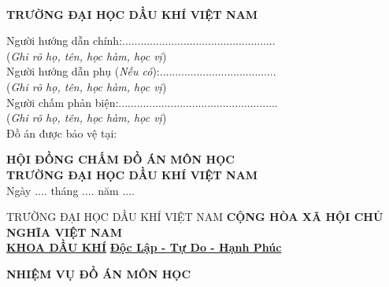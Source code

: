 \documentclass[12pt,a4paper]{report}
\begin{document}

\begin{center}
	\centering
	\\ 
	\textbf{TRƯỜNG ĐẠI HỌC DẦU KHÍ VIỆT NAM}
\end{center}
Người hướng dẫn chính:..................................................\\
(\textit{Ghi rõ họ, tên, học hàm, học vị})\\
\newline
Người hướng dẫn phụ (\textit{Nếu có}):......................................\\
(\textit{Ghi rõ họ, tên, học hàm, học vị})\\
\newline
Người chấm phản biện:....................................................\\
(\textit{Ghi rõ họ, tên, học hàm, học vị})\\
\newline
\newline
\newline
\newline
\newline
\newline
Đồ án được bảo vệ tại:
\begin{center}
	\centering
	\textbf{HỘI ĐỒNG CHẤM ĐỒ ÁN MÔN HỌC}\\
	\textbf{TRƯỜNG ĐẠI HỌC DẦU KHÍ VIỆT NAM}\\
	Ngày .... tháng .... năm ....
\end{center}
\newpage

\begingroup
\fontsize{10pt}{12pt}\selectfont
TRƯỜNG ĐẠI HỌC DẦU KHÍ VIỆT NAM \hspace*{1.5cm} \textbf{CỘNG HÒA XÃ HỘI CHỦ NGHĨA VIỆT NAM}\\
\hspace*{1.7cm}\underline{\textbf{KHOA DẦU KHÍ}} \hspace*{4.4cm} \underline{\textbf{Độc Lập - Tự Do - Hạnh Phúc}}
\endgroup

\begin{center}
	\centering
	\textbf{NHIỆM VỤ ĐỒ ÁN MÔN HỌC}
\end{center}
\end{document}
